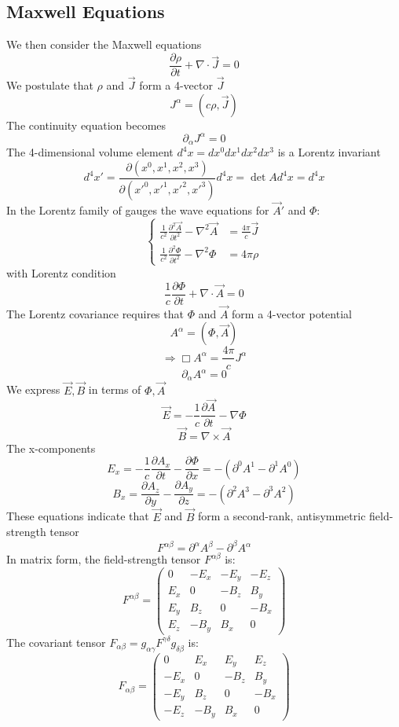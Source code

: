 \documentclass{article}
\begin{document}
	\subsection*{Maxwell Equations}
	We then consider the Maxwell equations
	\[
	\frac{\partial \rho}{\partial t} + \nabla \cdot \vec{J} = 0
	\]
	We postulate that $\rho$ and $\vec{J}$ form a 4-vector $\vec{J}$
	\[
	J^\alpha = (c\rho, \vec{J})
	\]
	The continuity equation becomes
	\[
	\partial_\alpha J^\alpha = 0
	\]
	The 4-dimensional volume element $d^4x = dx^0 dx^1 dx^2 dx^3$ is a Lorentz invariant
	\[
	d^4x' = \frac{\partial(x^0, x^1, x^2, x^3)}{\partial(x'^0, x'^1, x'^2, x'^3)} d^4x = \det A d^4x = d^4x
	\]
	In the Lorentz family of gauges the wave equations for $\vec{A}'$ and $\Phi$:
	\[
	\left\{
	\begin{aligned}
		\frac{1}{c^2}\frac{\partial^2\vec{A}}{\partial t^2} - \nabla^2\vec{A} &= \frac{4\pi}{c}\vec{J} \\
		\frac{1}{c^2}\frac{\partial^2\Phi}{\partial t^2} - \nabla^2\Phi &= 4\pi\rho
	\end{aligned}
	\right.
	\]
	with Lorentz condition
	\[
	\frac{1}{c}\frac{\partial\Phi}{\partial t} + \nabla\cdot\vec{A} = 0
	\]
	The Lorentz covariance requires that $\Phi$ and $\vec{A}$ form a 4-vector potential
	\[
	A^\alpha = (\Phi, \vec{A})
	\]
	\[
	\Rightarrow \Box A^\alpha = \frac{4\pi}{c} J^\alpha
	\]
	\[
	\partial_\alpha A^\alpha = 0
	\]
	We express $\vec{E}, \vec{B}$ in terms of $\Phi, \vec{A}$
	\[
	\vec{E} = -\frac{1}{c}\frac{\partial\vec{A}}{\partial t} - \nabla\Phi
	\]
	\[
	\vec{B} = \nabla \times \vec{A}
	\]
	The x-components
	\[
	E_x = -\frac{1}{c}\frac{\partial A_x}{\partial t} - \frac{\partial\Phi}{\partial x} = -(\partial^0 A^1 - \partial^1 A^0)
	\]
	\[
	B_x = \frac{\partial A_z}{\partial y} - \frac{\partial A_y}{\partial z} = -(\partial^2 A^3 - \partial^3 A^2)
	\]
	These equations indicate that $\vec{E}$ and $\vec{B}$ form a second-rank, antisymmetric field-strength tensor
	\[
	F^{\alpha\beta} = \partial^\alpha A^\beta - \partial^\beta A^\alpha
	\]
	In matrix form, the field-strength tensor $F^{\alpha\beta}$ is:
	\[
	F^{\alpha\beta} = 
	\begin{pmatrix}
		0 & -E_x & -E_y & -E_z \\
		E_x & 0 & -B_z & B_y \\
		E_y & B_z & 0 & -B_x \\
		E_z & -B_y & B_x & 0
	\end{pmatrix}
	\]
	The covariant tensor $F_{\alpha\beta} = g_{\alpha\gamma} F^{\gamma\delta} g_{\delta\beta}$ is:
	\[
	F_{\alpha\beta} = 
	\begin{pmatrix}
		0 & E_x & E_y & E_z \\
		-E_x & 0 & -B_z & B_y \\
		-E_y & B_z & 0 & -B_x \\
		-E_z & -B_y & B_x & 0
	\end{pmatrix}
	\]
\end{document}
